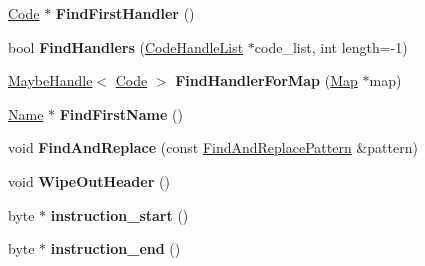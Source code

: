 \begin{DoxyCompactItemize}
\item 
\hypertarget{classv8_1_1internal_1_1_code_a802957d7f5a974c3b12a06b5ff968139}{}\hyperlink{classv8_1_1internal_1_1_code}{Code} $\ast$ {\bfseries Find\+First\+Handler} ()\label{classv8_1_1internal_1_1_code_a802957d7f5a974c3b12a06b5ff968139}

\item 
\hypertarget{classv8_1_1internal_1_1_code_a8148eca6e1bb8ee0df42bbc9d40e2e7b}{}bool {\bfseries Find\+Handlers} (\hyperlink{classv8_1_1internal_1_1_list}{Code\+Handle\+List} $\ast$code\+\_\+list, int length=-\/1)\label{classv8_1_1internal_1_1_code_a8148eca6e1bb8ee0df42bbc9d40e2e7b}

\item 
\hypertarget{classv8_1_1internal_1_1_code_abeaf71e20566acc56ab7b2c1ff3ca889}{}\hyperlink{classv8_1_1internal_1_1_maybe_handle}{Maybe\+Handle}$<$ \hyperlink{classv8_1_1internal_1_1_code}{Code} $>$ {\bfseries Find\+Handler\+For\+Map} (\hyperlink{classv8_1_1internal_1_1_map}{Map} $\ast$map)\label{classv8_1_1internal_1_1_code_abeaf71e20566acc56ab7b2c1ff3ca889}

\item 
\hypertarget{classv8_1_1internal_1_1_code_ae5f26cb764426268325d90f6fc53fb77}{}\hyperlink{classv8_1_1internal_1_1_name}{Name} $\ast$ {\bfseries Find\+First\+Name} ()\label{classv8_1_1internal_1_1_code_ae5f26cb764426268325d90f6fc53fb77}

\item 
\hypertarget{classv8_1_1internal_1_1_code_abb8cdd75f4e13a6cb8ffbe940253a5cc}{}void {\bfseries Find\+And\+Replace} (const \hyperlink{classv8_1_1internal_1_1_code_1_1_find_and_replace_pattern}{Find\+And\+Replace\+Pattern} \&pattern)\label{classv8_1_1internal_1_1_code_abb8cdd75f4e13a6cb8ffbe940253a5cc}

\item 
\hypertarget{classv8_1_1internal_1_1_code_adb5e049c29724f76c81113f3f2f7ec85}{}void {\bfseries Wipe\+Out\+Header} ()\label{classv8_1_1internal_1_1_code_adb5e049c29724f76c81113f3f2f7ec85}

\item 
\hypertarget{classv8_1_1internal_1_1_code_ab6c25848a714426ab9ed8f7501e89cb2}{}byte $\ast$ {\bfseries instruction\+\_\+start} ()\label{classv8_1_1internal_1_1_code_ab6c25848a714426ab9ed8f7501e89cb2}

\item 
\hypertarget{classv8_1_1internal_1_1_code_a98f72bddd264e2f7645594a73fe374ff}{}byte $\ast$ {\bfseries instruction\+\_\+end} ()\label{classv8_1_1internal_1_1_code_a98f72bddd264e2f7645594a73fe374ff}


\end{DoxyCompactItemize}
